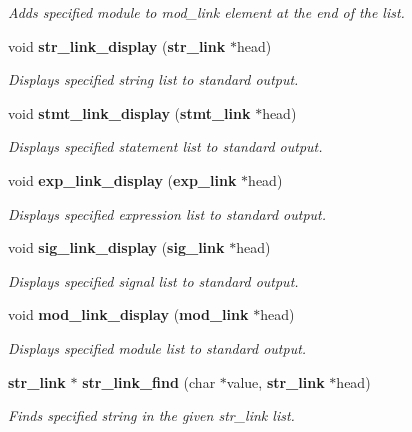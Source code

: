 \begin{CompactItemize}
\begin{CompactList}\small\item\em Adds specified module to mod\_\-link element at the end of the list.\item\end{CompactList}\item 
void {\bf str\_\-link\_\-display} ({\bf str\_\-link} $\ast$head)
\begin{CompactList}\small\item\em Displays specified string list to standard output.\item\end{CompactList}\item 
void {\bf stmt\_\-link\_\-display} ({\bf stmt\_\-link} $\ast$head)
\begin{CompactList}\small\item\em Displays specified statement list to standard output.\item\end{CompactList}\item 
void {\bf exp\_\-link\_\-display} ({\bf exp\_\-link} $\ast$head)
\begin{CompactList}\small\item\em Displays specified expression list to standard output.\item\end{CompactList}\item 
void {\bf sig\_\-link\_\-display} ({\bf sig\_\-link} $\ast$head)
\begin{CompactList}\small\item\em Displays specified signal list to standard output.\item\end{CompactList}\item 
void {\bf mod\_\-link\_\-display} ({\bf mod\_\-link} $\ast$head)
\begin{CompactList}\small\item\em Displays specified module list to standard output.\item\end{CompactList}\item 
{\bf str\_\-link} $\ast$ {\bf str\_\-link\_\-find} (char $\ast$value, {\bf str\_\-link} $\ast$head)
\begin{CompactList}\small\item\em Finds specified string in the given str\_\-link list.\item\end{CompactList}\item 

\end{CompactItemize}

